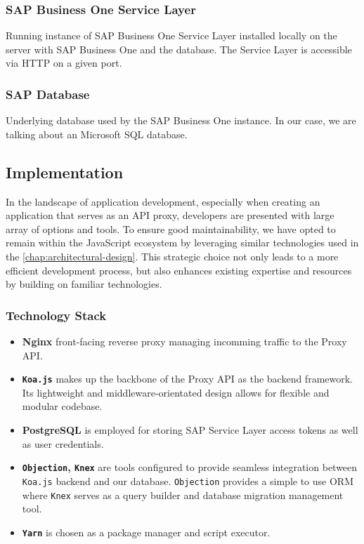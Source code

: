 \subsubsection{SAP Business One Service Layer}
Running instance of SAP Business One Service Layer installed locally on the server with SAP Business One and the database. 
The Service Layer is accessible via HTTP on a given port.

\subsubsection{SAP Database}
Underlying database used by the SAP Business One instance.
In our case, we are talking about an Microsoft SQL database.


\subsection{Implementation}
\label{subsec:implementation}
In the landscape of application development, especially when creating an application that serves as an API proxy, developers are presented with large array of options and tools.
To ensure good maintainability, we have opted to remain within the JavaScript ecosystem by leveraging similar technologies used in the \ref{chap:architectural-design}.
This strategic choice not only leads to a more efficient development process, but also enhances existing expertise and resources by building on familiar technologies.

\subsubsection{Technology Stack}

\begin{itemize}
    \item \textbf{Nginx} front-facing reverse proxy managing incomming traffic to the Proxy API.
    \item \textbf{\texttt{Koa.js}} makes up the backbone of the Proxy API as the backend framework. Its lightweight and middleware-orientated design allows for flexible and modular codebase. 
    \item \textbf{PostgreSQL} is employed for storing SAP Service Layer access tokens as well as user credentials.
    \item \textbf{\texttt{Objection}, \texttt{Knex}} are tools configured to provide seamless integration between \texttt{Koa.js} backend and our database. \texttt{Objection} provides a simple to use ORM where \texttt{Knex} serves as a query builder and database migration management tool.
    \item \textbf{\texttt{Yarn}} is chosen as a package manager and script executor.
\end{itemize}



